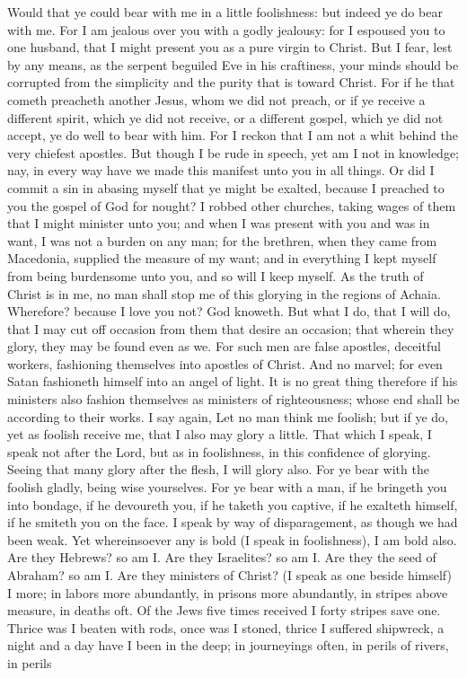 Would that ye could bear with me in a little foolishness: but indeed ye do bear with me. For I am jealous over you with a godly jealousy: for I espoused you to one husband, that I might present you as a pure virgin to Christ. But I fear, lest by any means, as the serpent beguiled Eve in his craftiness, your minds should be corrupted from the simplicity and the purity that is toward Christ. For if he that cometh preacheth another Jesus, whom we did not preach, or if ye receive a different spirit, which ye did not receive, or a different gospel, which ye did not accept, ye do well to bear with him. For I reckon that I am not a whit behind the very chiefest apostles. But though I be rude in speech, yet am I not in knowledge; nay, in every way have we made this manifest unto you in all things. Or did I commit a sin in abasing myself that ye might be exalted, because I preached to you the gospel of God for nought? I robbed other churches, taking wages of them that I might minister unto you; and when I was present with you and was in want, I was not a burden on any man; for the brethren, when they came from Macedonia, supplied the measure of my want; and in everything I kept myself from being burdensome unto you, and so will I keep myself. As the truth of Christ is in me, no man shall stop me of this glorying in the regions of Achaia. Wherefore? because I love you not? God knoweth. But what I do, that I will do, that I may cut off occasion from them that desire an occasion; that wherein they glory, they may be found even as we. For such men are false apostles, deceitful workers, fashioning themselves into apostles of Christ. And no marvel; for even Satan fashioneth himself into an angel of light. It is no great thing therefore if his ministers also fashion themselves as ministers of righteousness; whose end shall be according to their works.  I say again, Let no man think me foolish; but if ye do, yet as foolish receive me, that I also may glory a little. That which I speak, I speak not after the Lord, but as in foolishness, in this confidence of glorying. Seeing that many glory after the flesh, I will glory also. For ye bear with the foolish gladly, being wise yourselves. For ye bear with a man, if he bringeth you into bondage, if he devoureth you, if he taketh you captive, if he exalteth himself, if he smiteth you on the face. I speak by way of disparagement, as though we had been weak. Yet whereinsoever any is bold (I speak in foolishness), I am bold also. Are they Hebrews? so am I. Are they Israelites? so am I. Are they the seed of Abraham? so am I. Are they ministers of Christ? (I speak as one beside himself) I more; in labors more abundantly, in prisons more abundantly, in stripes above measure, in deaths oft. Of the Jews five times received I forty stripes save one. Thrice was I beaten with rods, once was I stoned, thrice I suffered shipwreck, a night and a day have I been in the deep; in journeyings often, in perils of rivers, in perils 